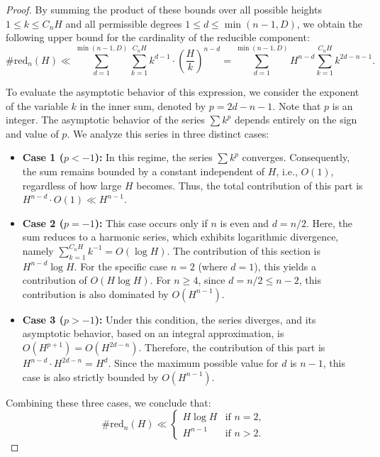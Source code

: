 \documentclass[11pt,a4paper]{article}
\begin{document}
\begin{proof}
By summing the product of these bounds over all possible heights $1 \le k \le C_n H$ and all permissible degrees $1 \le d \le \min(n-1, D)$, we obtain the following upper bound for the cardinality of the reducible component:
\begin{equation*}
    \#\mathrm{red}_n(H) \ll \sum_{d=1}^{\min(n-1, D)} \sum_{k=1}^{C_n H} k^{d-1} \cdot \left(\frac{H}{k}\right)^{n-d} = \sum_{d=1}^{\min(n-1, D)} H^{n-d} \sum_{k=1}^{C_n H} k^{2d-n-1}.
\end{equation*}

To evaluate the asymptotic behavior of this expression, we consider the exponent of the variable $k$ in the inner sum, denoted by $p = 2d - n - 1$. Note that $p$ is an integer. The asymptotic behavior of the series $\sum k^p$ depends entirely on the sign and value of $p$. We analyze this series in three distinct cases:

\begin{itemize}
    \item \textbf{Case 1 ($p < -1$):} In this regime, the series $\sum k^p$ converges. Consequently, the sum remains bounded by a constant independent of $H$, i.e., $O(1)$, regardless of how large $H$ becomes. Thus, the total contribution of this part is $H^{n-d} \cdot O(1) \ll H^{n-1}$.
    
    \item \textbf{Case 2 ($p = -1$):} This case occurs only if $n$ is even and $d = n/2$. Here, the sum reduces to a harmonic series, which exhibits logarithmic divergence, namely $\sum_{k=1}^{C_n H} k^{-1} = O(\log H)$. The contribution of this section is $H^{n-d}\log H$. For the specific case $n=2$ (where $d=1$), this yields a contribution of $O(H \log H)$. For $n \ge 4$, since $d = n/2 \le n-2$, this contribution is also dominated by $O(H^{n-1})$.
    
    \item \textbf{Case 3 ($p > -1$):} Under this condition, the series diverges, and its asymptotic behavior, based on an integral approximation, is $O(H^{p+1}) = O(H^{2d-n})$. Therefore, the contribution of this part is $H^{n-d} \cdot H^{2d-n} = H^d$. Since the maximum possible value for $d$ is $n-1$, this case is also strictly bounded by $O(H^{n-1})$.
\end{itemize}

Combining these three cases, we conclude that:
\begin{equation*}
    \#\mathrm{red}_n(H) \ll 
    \begin{cases} 
      H \log H & \text{if } n = 2, \\
      H^{n-1} & \text{if } n > 2.
    \end{cases}
\end{equation*}


\end{proof}
\end{document}
